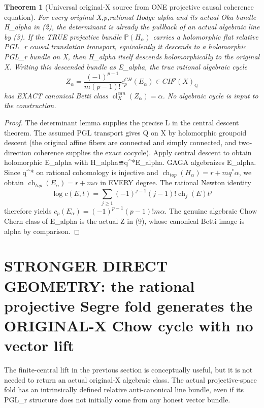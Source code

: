 \documentclass[11pt]{article}
\newtheorem{theorem}{Theorem}
\begin{document}
\begin{theorem}[Universal original-X source from ONE projective causal coherence equation]
For every original X,p,rational
Hodge alpha and its actual
Oka bundle H_alpha in (2),
the determinant is already
the pullback of an actual
algebraic line by (3).
If the TRUE projective bundle
$\mathbb P(H_\alpha)$ carries
a holomorphic flat relative
PGL_r causal translation transport,
equivalently it descends to a
holomorphic PGL_r bundle on X,
then H_alpha itself descends
holomorphically to the original X.
Writing this descended bundle
as E_alpha, the true rational
algebraic cycle
\[
 \boxed{
 Z_\alpha=
  \frac{(-1)^{p-1}}{m(p-1)!}
          c_p^{CH}(E_\alpha)
       \in CH^p(X)_\mathbb Q
                                                             \tag{9}
 }
\]
has EXACT canonical Betti class
$\operatorname{cl}_X^{can}(Z_\alpha)=\alpha$.
No algebraic cycle is input to
the construction.
\end{theorem}
\begin{proof}
The determinant lemma supplies
the precise L in the central
descent theorem. The assumed
PGL transport gives Q on X by
holomorphic groupoid descent
(the original affine fibers
are connected and simply
connected, and two-direction
coherence supplies the exact
cocycle). Apply central descent
to obtain holomorphic E_alpha
with H_alpha≅q^*E_alpha.
GAGA algebraizes E_alpha.
Since q^* on rational cohomology
is injective and
$\operatorname{ch}_{top}(H_\alpha)
=r+m q^*\alpha$, we obtain
$\operatorname{ch}_{top}(E_\alpha)
=r+m\alpha$ in EVERY degree.
The rational Newton identity
\[
 \log c(E,t)=
 \sum_{j\ge1}(-1)^{j-1}(j-1)!
                \operatorname{ch}_j(E)t^j
                                                             \tag{10}
\]
therefore yields
$c_p(E_\alpha)=(-1)^{p-1}
 (p-1)!m\alpha$. The genuine
algebraic Chow Chern class
of E_alpha is the actual Z
in (9), whose canonical Betti
image is alpha by comparison.
\end{proof}

\section{STRONGER DIRECT GEOMETRY: the rational projective Segre fold generates the ORIGINAL-X Chow cycle with no vector lift}

The finite-central lift in the previous
section is conceptually useful, but it
is not needed to return an actual
original-X algebraic class. The actual
projective-space fold has an intrinsically
defined relative anti-canonical line
bundle, even if its PGL_r structure does
not initially come from any
honest vector bundle.
\end{document}
